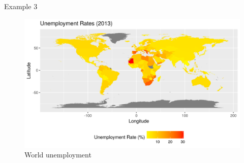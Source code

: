 \documentclass[10pt]{beamer}
\begin{document}
\begin{frame}{Example 3}
	\begin{figure}
		\centering
		\includegraphics[width=\textwidth]{unemploy.png}
		\caption[World unemployment]{World unemployment}
	\end{figure}
\end{frame}
\end{document}
